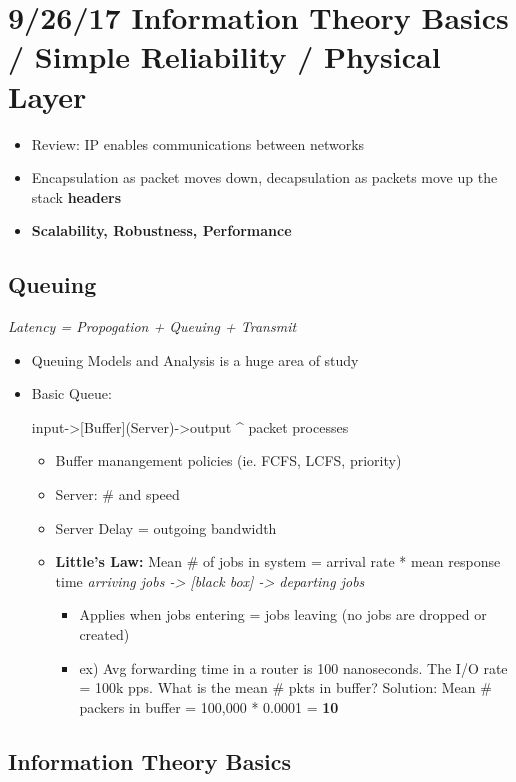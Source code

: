 \documentclass[11pt]{article}
\begin{document}
\section{9/26/17  Information Theory Basics / Simple Reliability / Physical Layer}
\label{sec:orgheadline28}

\begin{itemize}
\item Review: IP enables communications between networks
\item Encapsulation as packet moves down, decapsulation as packets move up the
stack \textbf{headers}
\item \textbf{Scalability, Robustness, Performance}
\end{itemize}

\subsection{Queuing}
\label{sec:orgheadline21}

\emph{Latency = Propogation + Queuing + Transmit}
\begin{itemize}
\item Queuing Models and Analysis is a huge area of study
\item Basic Queue:

input->[Buffer](Server)->output 
\^{} packet processes

\begin{itemize}
\item Buffer manangement policies (ie. FCFS, LCFS, priority)
\item Server: \# and speed
\item Server Delay = outgoing bandwidth
\item \textbf{Little's Law:} Mean \# of jobs in system = arrival rate * mean response
time
\emph{arriving jobs -> [black box] -> departing jobs}

\begin{itemize}
\item Applies when jobs entering = jobs leaving (no jobs are dropped or created)
\item ex) Avg forwarding time in a router is 100 nanoseconds. The I/O rate =
100k pps. What is the mean \# pkts in buffer? Solution: Mean \# packers
in buffer = 100,000 * 0.0001 = \textbf{10}
\end{itemize}
\end{itemize}
\end{itemize}

\subsection{Information Theory Basics}
\label{sec:orgheadline26}
\end{document}
